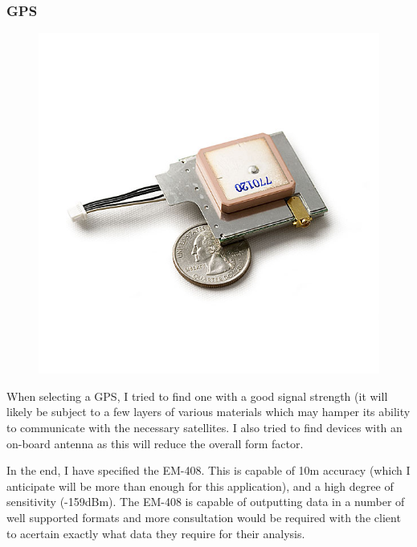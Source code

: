 \documentclass[a4paper, twoside]{article}
\begin{document}
\subsubsection{GPS}
\begin{figure}
	\begin{center}
		\includegraphics[scale=0.2]{images/em-408.jpg}
	\end{center}
\end{figure}

When selecting a GPS, I tried to find one with a good signal strength (it will
likely be subject to a few layers of various materials which may hamper its
ability to communicate with the necessary satellites. I also tried to find
devices with an on-board antenna as this will reduce the overall form factor.

In the end, I have specified the EM-408. This is capable of 10m accuracy (which
I anticipate will be more than enough for this application), and a high degree of
sensitivity (-159dBm). The EM-408 is capable of outputting data in a number of
well supported formats and more consultation would be required with the client
to acertain exactly what data they require for their analysis.

\clearpage
\end{document}
